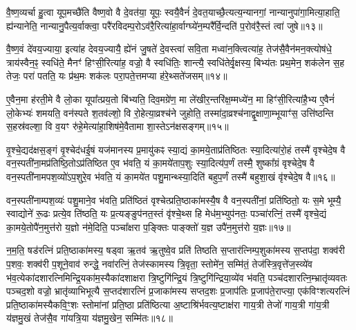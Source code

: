 {\anuvakamend[{अथ॑ ददते॒ स्वया॒ सन्थ्स्व॑धाका॒रो हि वि॑न्दति॥२॥}]}

वै॒ष्ण॒व्यर्चा हु॒त्वा यूप॒मच्छै॑ति वैष्ण॒वो वै दे॒वत॑या॒ यूपः॒ स्वयै॒वैनं॑ दे॒वत॒याच्छै॒त्यत्य॒न्यानगां॒ नान्यानुपा॑गा॒मित्या॒हाति॒ ह्य॑न्यानेति॒ नान्यानु॒पैत्य॒र्वाक्त्वा॒ परै॑रविदम्प॒रो\-ऽव॑रै॒रित्या॑हा॒र्वाग्घ्ये॑न॒म्परै᳚र्वि॒न्दति॑ प॒रोव॑रै॒स्तं त्वा॑ जुषे॥१३॥

वै॒ष्ण॒वं दे॑वय॒ज्याया॒ इत्या॑ह देवय॒ज्यायै॒ ह्ये॑नं जु॒षते॑ दे॒वस्त्वा॑ सवि॒ता मध्वा॑न॒क्त्वित्या॑ह॒ तेज॑सै॒वैन॑मन॒क्त्योष॑धे॒ त्राय॑स्वैन॒ꣴ॒ स्वधि॑ते॒ मैनꣳ॑ हिꣳसी॒रित्या॑ह॒ वज्रो॒ वै स्वधि॑तिः॒ शान्त्यै॒ स्वधि॑तेर्वृ॒क्षस्य॒ बिभ्य॑तः प्रथ॒मेन॒ शक॑लेन स॒ह तेजः॒ परा॑ पतति॒ यः प्र॑थ॒मः शक॑लः परा॒पते॒त्तमप्या ह॑रे॒थ्सते॑जसम्॥१४॥

ए॒वैन॒मा ह॑रती॒मे वै लो॒का यूपा᳚त्प्रय॒तो बि॑भ्यति॒ दिव॒मग्रे॑ण॒ मा ले॑खीर॒न्तरि॑क्ष॒म्मध्ये॑न॒ मा हिꣳ॑सी॒रित्या॑है॒भ्य ए॒वैनं॑ लो॒केभ्यः॑ शमयति॒ वन॑स्पते श॒तव॑ल्\mbox{}शो॒ वि रो॒हेत्या॒व्रश्च॑ने जुहोति॒ तस्मा॑दा॒व्रश्च॑नाद्वृ॒क्षाणा॒म्भूयाꣳ॑स॒ उत्ति॑ष्ठन्ति स॒हस्र॑वल्\mbox{}शा॒ वि व॒यꣳ रु॑हे॒मेत्या॑हा॒शिष॑मे॒वैतामा शा॒स्ते\-ऽन॑क्षसङ्गम्॥१५॥

वृ॒श्चे॒द्यद॑क्षस॒ङ्गं वृ॒श्चेद॑धई॒षं यज॑मानस्य प्र॒मायु॑कꣴ स्या॒द्यं का॒मये॒ताप्र॑तिष्ठितः स्या॒दित्या॑रो॒हं तस्मै॑ वृश्चेदे॒ष वै वन॒स्पती॑ना॒मप्र॑तिष्ठि॒तो\-ऽप्र॑तिष्ठित ए॒व भ॑वति॒ यं का॒मये॑ताप॒शुः स्या॒दित्य॑प॒र्णं तस्मै॒ शुष्का᳚ग्रं वृश्चेदे॒ष वै वन॒स्पती॑नामपश॒व्यो॑\-ऽप॒शुरे॒व भ॑वति॒ यं का॒मये॑त पशु॒मान्थ्स्या॒दिति॑ बहुप॒र्णं तस्मै॑ बहुशा॒खं वृ॑श्चेदे॒ष वै॥१६॥

वन॒स्पती॑नाम्पश॒व्यः॑ पशु॒माने॒व भ॑वति॒ प्रति॑ष्ठितं वृश्चेत्प्रति॒ष्ठाका॑मस्यै॒ष वै वन॒स्पती॑नां॒ प्रति॑ष्ठितो॒ यः स॒मे भूम्यै॒ स्वाद्योने॑ रू॒ढः प्रत्ये॒व ति॑ष्ठति॒ यः प्र॒त्यङ्ङुप॑नत॒स्तं वृ॑श्चे॒थ्स हि मेध॑म॒भ्युप॑नतः॒ पञ्चा॑रत्निं॒ तस्मै॑ वृश्चे॒द्यं का॒मये॒तोपै॑न॒मुत्त॑रो य॒ज्ञो न॑मे॒दिति॒ पञ्चा᳚क्षरा प॒ङ्क्तिः पाङ्क्तो॑ य॒ज्ञ उपै॑न॒मुत्त॑रो य॒ज्ञः॥१७॥

न॒म॒ति॒ षड॑रत्निं प्रति॒ष्ठाका॑मस्य॒ षड्वा ऋ॒तव॑ ऋ॒तुष्वे॒व प्रति॑ तिष्ठति स॒प्तार॑त्निम्प॒शुका॑मस्य स॒प्तप॑दा॒ शक्व॑री प॒शवः॒ शक्व॑री प॒शूने॒वाव॑ रुन्द्धे॒ नवा॑रत्निं॒ तेज॑स्कामस्य त्रि॒वृता॒ स्तोमे॑न॒ सम्मि॑तं॒ तेज॑स्त्रि॒वृत्ते॑ज॒स्व्ये॑व भ॑व॒त्येका॑दशारत्नि\-मिन्द्रि॒यका॑म॒स्यैका॑दशाक्षरा त्रि॒ष्टुगि॑न्द्रि॒यं त्रि॒ष्टुगि॑न्द्रिया॒व्ये॑व भ॑वति॒ पञ्च॑दशारत्नि॒म्भ्रातृ॑व्यवतः पञ्चद॒शो वज्रो॒ भ्रातृ॑व्याभिभूत्यै स॒प्तद॑शारत्निं प्र॒जाका॑मस्य सप्तद॒शः प्र॒जाप॑तिः प्र॒जाप॑ते॒राप्त्या॒ एक॑विꣳशत्यरत्निं प्रति॒ष्ठाका॑मस्यैक\-वि॒ꣳ॒शः स्तोमा॑नां प्रति॒ष्ठा प्रति॑ष्ठित्या अ॒ष्टाश्रि॑र्भवत्य॒ष्टाक्ष॑रा गाय॒त्री तेजो॑ गाय॒त्री गा॑य॒त्री य॑ज्ञमु॒खं तेज॑सै॒व गा॑यत्रि॒या य॑ज्ञमु॒खेन॒ सम्मि॑तः॥१८॥

